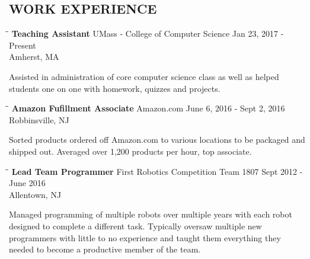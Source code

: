 \documentclass{res}
\begin{document}
\begin{resume}
\section{WORK EXPERIENCE}
   \vspace{-0.1in}	
   \begin{tabbing}
   \hspace{2.3in}\= \hspace{2.6in}\= \kill %
    {\bf Teaching Assistant} \>UMass - College of Computer Science    \>Jan 23, 2017 - Present\\
                             \>Amherst, MA
   \end{tabbing}\vspace{-20pt}      %
    Assisted in administration of core computer science class as well as helped students one on one with homework, quizzes and projects.
   \vspace{-0.1in}	
   \begin{tabbing}
   \hspace{2.3in}\= \hspace{2.6in}\= \kill %
    {\bf Amazon Fufillment Associate} \>Amazon.com    \>June 6, 2016 - Sept 2, 2016\\
                             \>Robbinsville, NJ
   \end{tabbing}\vspace{-20pt}      %
    Sorted products ordered off Amazon.com to various locations to be packaged and shipped out. Averaged over 1,200 products per hour, top associate.
   \vspace{-0.2in}
   \begin{tabbing}
   \hspace{2.3in}\= \hspace{2.6in}\= \kill %
    {\bf Lead Team Programmer} \>First Robotics Competition Team 1807 \>  Sept 2012 - June 2016 \\
                          \>Allentown, NJ
   \end{tabbing}\vspace{-20pt}         %
    Managed programming of multiple robots over multiple years with each robot designed to complete a different task. Typically oversaw multiple new programmers with little to no experience
     and taught  them everything they needed to become a productive member of the team. 
   \vspace{-0.2in}

\end{resume}
\end{document}
